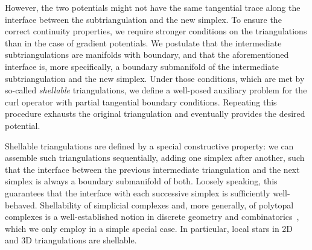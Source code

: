 However, the two potentials might not have the same tangential trace along the interface between the subtriangulation and the new simplex. 
To ensure the correct continuity properties, we require stronger conditions on the triangulations than in the case of gradient potentials. 
We postulate that the intermediate subtriangulations are manifolds with boundary, and that the aforementioned interface is, more specifically, a boundary submanifold of the intermediate subtriangulation and the new simplex. 
Under those conditions, which are met by so-called \textit{shellable} triangulations, 
we define a well-posed auxiliary problem for the curl operator with partial tangential boundary conditions. 
Repeating this procedure exhausts the original triangulation and eventually provides the desired potential.

















Shellable triangulations are defined by a special constructive property:
we can assemble such triangulations sequentially, adding one simplex after another, such that the interface between the previous intermediate triangulation and the next simplex is always a boundary submanifold of both.
Loosely speaking, this guarantees that the interface with each successive simplex is sufficiently well-behaved.
Shellability of simplicial complexes and, more generally, of polytopal complexes is a well-established notion in discrete geometry and combinatorics~\cite{ziegler1995lectures}, which we only employ in a simple special case. 
In particular, local stars in 2D and 3D triangulations are shellable. 







